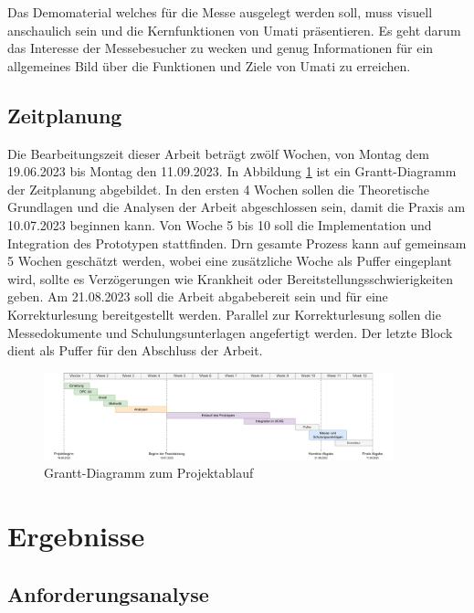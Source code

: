 \documentclass[a4paper, 12pt, oneside, toc=listofnumbered, bibliography=totoc]{scrbook}
\begin{document}
	Das Demomaterial welches für die Messe ausgelegt werden soll, muss visuell anschaulich sein und die Kernfunktionen von \ac{Umati} präsentieren. Es geht darum das Interesse der Messebesucher zu wecken und genug Informationen für ein allgemeines Bild über die Funktionen und Ziele von \ac{Umati} zu erreichen. 
	
	
	\section{Zeitplanung}
	
	Die Bearbeitungszeit dieser Arbeit beträgt zwölf Wochen, von Montag dem 19.06.2023 bis Montag den 11.09.2023. In Abbildung \ref{fig:Grantt} ist ein Grantt-Diagramm der Zeitplanung abgebildet. In den ersten 4 Wochen sollen die Theoretische Grundlagen und die Analysen der Arbeit abgeschlossen sein, damit die Praxis am 10.07.2023 beginnen kann. Von Woche 5 bis 10 soll die Implementation und Integration des Prototypen stattfinden. Drn gesamte Prozess kann auf gemeinsam 5 Wochen geschätzt werden, wobei eine zusätzliche Woche als Puffer eingeplant wird, sollte es Verzögerungen wie Krankheit oder Bereitstellungsschwierigkeiten geben. Am 21.08.2023 soll die Arbeit abgabebereit sein und für eine Korrekturlesung bereitgestellt werden. Parallel zur Korrekturlesung sollen die Messedokumente und Schulungsunterlagen angefertigt werden. Der letzte Block dient als Puffer für den Abschluss der Arbeit.
	
	\begin{figure}[H]
		\centering
		\includegraphics[width=0.9\textwidth]{res/analysen/Grantt-Diagramm.pdf}
		\caption{Grantt-Diagramm zum Projektablauf}
		\label{fig:Grantt}
	\end{figure}
	
	
\chapter{Ergebnisse}\label{ch:Ergebnisse}
	
	
	\section{Anforderungsanalyse}
		
\end{document}
